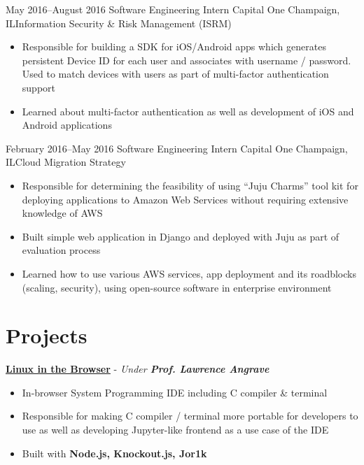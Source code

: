 \documentclass[10pt,a4paper,sans]{moderncv}        %
\begin{document}
\vspace{3pt}

\cventry
{May 2016--August 2016}
{\vspace{3pt}Software Engineering Intern}
{Capital One}
{Champaign, IL}{Information Security \& Risk Management (ISRM)}
{\vspace{3pt}
\begin{itemize}
  \item Responsible for building a SDK for iOS/Android apps which generates persistent
        Device ID for each user and associates with username / password.
        Used to match devices with users as part of multi-factor authentication support
  \item Learned about multi-factor authentication as well as development of iOS and Android
        applications
\end{itemize}}

\vspace{3pt}

\cventry
{February 2016--May 2016}
{\vspace{3pt}Software Engineering Intern}
{Capital One}
{Champaign, IL}{Cloud Migration Strategy}
{\vspace{3pt}
\begin{itemize}
  \item Responsible for determining the feasibility of using ``Juju Charms'' tool kit
        for deploying applications to Amazon Web Services without requiring extensive
        knowledge of AWS
  \item Built simple web application in Django and deployed with Juju
        as part of evaluation process
  \item Learned how to use various AWS services, app deployment and its roadblocks (scaling, security),
        using open-source software in enterprise environment
\end{itemize}}

\section{Projects}

\vspace{5pt}
\textbf{\href{http://cs-education.github.io/sys/}{Linux in the Browser}} - \textit{Under \textbf{Prof. Lawrence Angrave}}
\begin{itemize}
  \item In-browser System Programming IDE including C compiler \& terminal
  \item Responsible for making C compiler / terminal more portable for developers to use
        as well as developing Jupyter-like frontend as a use case of the IDE
  \item Built with \textbf{Node.js, Knockout.js, Jor1k}
\end{itemize}
\end{document}
